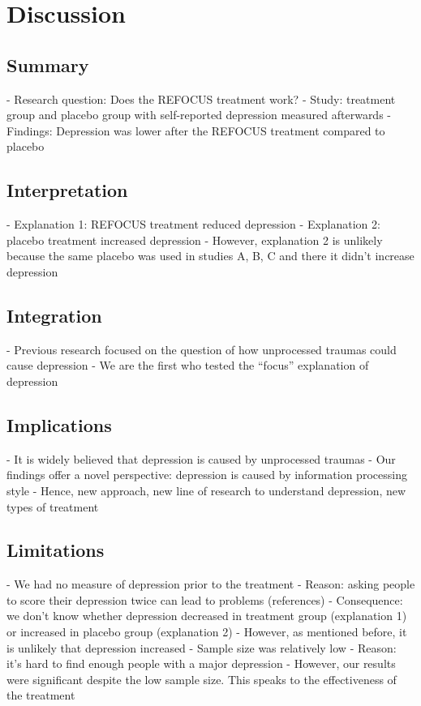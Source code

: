 \chapter{Discussion}

\section{Summary}
\label{summary}

- Research question: Does the REFOCUS treatment work?
- Study: treatment group and placebo group with self-reported depression measured afterwards
- Findings: Depression was lower after the REFOCUS treatment compared to placebo

\section{Interpretation}
\label{interpretation}

- Explanation 1: REFOCUS treatment reduced depression
- Explanation 2: placebo treatment increased depression
- However, explanation 2 is unlikely because the same placebo was used in studies
A, B, C and there it didn’t increase depression

\section{Integration}
\label{integration}

- Previous research focused on the question of how unprocessed traumas could cause
depression
- We are the first who tested the “focus” explanation of depression

\section{Implications}
\label{implications}

- It is widely believed that depression is caused by unprocessed traumas
- Our findings offer a novel perspective: depression is caused by information
processing style
- Hence, new approach, new line of research to understand depression, new types of
treatment

\section{Limitations}
\label{limitations}

- We had no measure of depression prior to the treatment
- Reason: asking people to score their depression twice can lead to problems
(references)
- Consequence: we don’t know whether depression decreased in treatment
group (explanation 1) or increased in placebo group (explanation 2)
- However, as mentioned before, it is unlikely that depression increased
- Sample size was relatively low
- Reason: it’s hard to find enough people with a major depression
- However, our results were significant despite the low sample size. This speaks
to the effectiveness of the treatment

